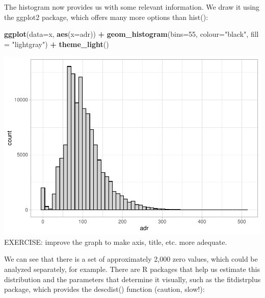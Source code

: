 \documentclass[
]{article}
\newenvironment{Shaded}{\begin{snugshade}}{\end{snugshade}}
\newcommand{\AttributeTok}[1]{\textcolor[rgb]{0.13,0.29,0.53}{#1}}
\newcommand{\DecValTok}[1]{\textcolor[rgb]{0.00,0.00,0.81}{#1}}
\newcommand{\FunctionTok}[1]{\textcolor[rgb]{0.13,0.29,0.53}{\textbf{#1}}}
\newcommand{\NormalTok}[1]{#1}
\newcommand{\OtherTok}[1]{\textcolor[rgb]{0.56,0.35,0.01}{#1}}
\newcommand{\SpecialCharTok}[1]{\textcolor[rgb]{0.81,0.36,0.00}{\textbf{#1}}}
\newcommand{\StringTok}[1]{\textcolor[rgb]{0.31,0.60,0.02}{#1}}
\begin{document}
\begin{Shaded}
\end{Shaded}

The histogram now provides us with some relevant information. We draw it
using the ggplot2 package, which offers many more options than hist():

\begin{Shaded}
\begin{Highlighting}[]
\FunctionTok{ggplot}\NormalTok{(}\AttributeTok{data=}\NormalTok{x, }\FunctionTok{aes}\NormalTok{(}\AttributeTok{x=}\NormalTok{adr)) }\SpecialCharTok{+} 
  \FunctionTok{geom\_histogram}\NormalTok{(}\AttributeTok{bins=}\DecValTok{55}\NormalTok{, }\AttributeTok{colour=}\StringTok{"black"}\NormalTok{, }\AttributeTok{fill =} \StringTok{"lightgray"}\NormalTok{) }\SpecialCharTok{+}
  \FunctionTok{theme\_light}\NormalTok{()}
\end{Highlighting}
\end{Shaded}

\includegraphics{hotel_bookings_files/figure-latex/hist_adr-1.pdf}
EXERCISE: improve the graph to make axis, title, etc. more adequate.

We can see that there is a set of approximately 2,000 zero values, which
could be analyzed separately, for example. There are R packages that
help us estimate this distribution and the parameters that determine it
visually, such as the fitdistrplus package, which provides the
descdist() function (caution, slow!):
\end{document}
